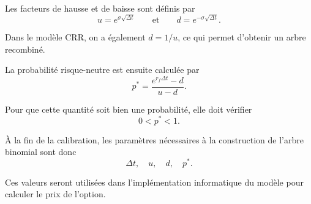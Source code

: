 \documentclass[12pt,a4paper]{report}
\begin{document}
Les facteurs de hausse et de baisse sont définis par
\[
u = e^{\sigma\sqrt{\Delta t}}
\qquad \text{et} \qquad
d = e^{-\sigma\sqrt{\Delta t}}.
\]

Dans le modèle CRR, on a également $d = 1/u$, ce qui permet d'obtenir un arbre recombiné.

La probabilité risque-neutre est ensuite calculée par
\[
p^* = \frac{e^{r_f \Delta t} - d}{u - d}.
\]

Pour que cette quantité soit bien une probabilité, elle doit vérifier
\[
0 < p^* < 1.
\]

À la fin de la calibration, les paramètres nécessaires à la construction de l'arbre binomial sont donc
\[
\Delta t, \quad u, \quad d, \quad p^*.
\]

Ces valeurs seront utilisées dans l'implémentation informatique du modèle pour calculer le prix de l'option.
\end{document}
